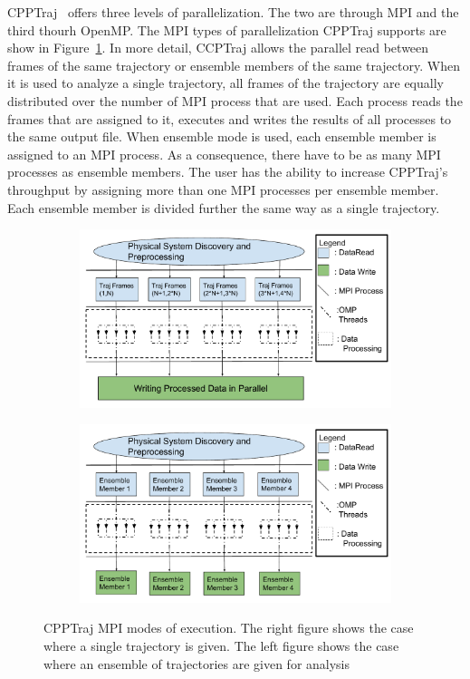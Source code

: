 CPPTraj~\cite{cpptraj-2013} offers three levels of parallelization. The two are through MPI and the third thourh OpenMP.
The MPI types of parallelization CPPTraj supports are show in Figure~\ref{fig:cpptraj_arch}. In more detail,
CCPTraj allows the parallel read between frames of the same trajectory or ensemble members of
the same trajectory. When it is used to analyze a single trajectory, all frames of the trajectory
are equally distributed over the number of MPI process that are used. Each process reads the frames
that are assigned to it, executes and writes the results of all processes to the same output file.
When ensemble mode is used, each ensemble member is assigned to an MPI process. As a consequence,
there have to be as many MPI processes as ensemble members. The user has the ability to increase 
CPPTraj's throughput by assigning more than one MPI processes per ensemble member. Each ensemble 
member is divided further the same way as a single trajectory.
\begin{figure}[ht!]
		\begin{subfigure}{.5\textwidth}
		\centering
		\includegraphics[width=.95\textwidth]{figures/CPPTrajExecutionSchematicSingleTrajectory.pdf}
	\end{subfigure}
	\begin{subfigure}{.5\textwidth}
		\centering
		\includegraphics[width=.95\linewidth]{figures/CPPTrajExecutionSchematicEnsembleTrajectories.pdf}
	\end{subfigure}
	\caption{CPPTraj MPI modes of execution. The right figure shows the case where a single trajectory is
		given. The left figure shows the case where an ensemble of trajectories are given for analysis}
	\label{fig:cpptraj_arch}
\end{figure}

